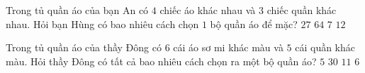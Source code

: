 \begin{ex}%
	Trong tủ quần áo của bạn An có $4$ chiếc áo khác nhau và $3$ chiếc quần khác nhau. Hỏi bạn Hùng có bao nhiêu cách chọn $1$ bộ quần áo để mặc?
	\choice
	{$27$}
	{$64$}
	{$7$}
	{\True $12$}
\end{ex}%
\begin{ex}%
Trong tủ quần áo của thầy Đông có $6$ cái áo sơ mi khác màu và $5$ cái quần khác màu. Hỏi thầy Đông có tất cả bao nhiêu cách chọn ra một bộ quần áo?
	\choice
	{$5$}
	{ \True $30$}
	{ $11$}
	{$6$}
\end{ex}